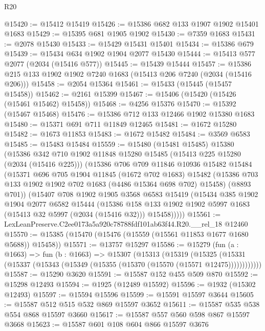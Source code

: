 \begin{lexlean}{R20}
\begin{coremodule}
@15420 := @15412 @15419
@15426 := @15386 @682 @133 @1907 @1902 @15401 @1683
@15429 := @15395 @681 @1905 @1902
@15430 := @7359 @1683
@15431 := @2078 @15430
@15433 := @15429 @15431 @15401
@15434 := @15386 @679
@15439 := @15434 @634 @1902 @1904 @2077 @15430
@15444 := @15413 @577 @2077 (@2034 (@15416 @577))
@15445 := @15439 @15444
@15457 := @15386 @215 @133 @1902 @1902 @7240 @1683 (@15413 @206 @7240 (@2034 (@15416 @206)))
@15458 := @2054 @15364
@15461 := @15433 (@15445 (@15457 @15458))
@15462 := @2161 @15399
@15467 := @15406 (@15420 (@15426 (@15461 @15462) @15458))
@15468 := @4256 @15376
@15470 := @15392 (@15467 @15468)
@15476 := @15386 @712 @133 @12466 @1902 @15380 @1683
@15480 := @15371 @691 @711 @11849 @12465
@15481 := @1672 @15280
@15482 := @1673 @11853
@15483 := @1672 @15482
@15484 := @3569 @6583
@15485 := @15483 @15484
@15559 := @15480
    (@15481 @15485)
    @15380
    (@15386
      @342
      @710
      @1902
      @11848
      @15280
      @15485
      (@15413 @225 @15280 (@2034 (@15416 @225)))
      (@15386
        @706
        @709
        @11846
        @10936
        @15482
        @15484
        (@15371
          @696
          @705
          @1904
          @11845
          (@1672 @702 @1683)
          @15482
          (@15386 @703 @133 @1902 @1902 @702 @1683 (@4486 @15364 @698 @702) @15458)
          (@8893 @701))
        (@15407
          @708
          @1902
          @1905
          @3568
          @6583
          @15419
          (@15434
            @385
            @1902
            @1904
            @2077
            @6582
            @15444
            (@15386
              @158
              @133
              @1902
              @1902
              @5997
              @1683
              (@15413 @32 @5997 (@2034 (@15416 @32)))
              @15458)))))
@15561 := LexLeanPreserve.C2ee0173a5a920c78788fdf101ab63f44.R20.__rel_18 @12460
@15570 := @15385 (@15470 (@15476 (@15559 (@15561 @11853 @1677 @1680 @5688)) @15458))
@15571 := @13757 @15297
@15586 := @15279
    (fun (a : @1663) =>
    fun (b : @1663) =>
    @15307
      (@15313
        (@15319
          (@15325 (@15331 (@15337 (@15343 (@15349 (@15355 (@15370 (@15570 (@15571 @12475))))))))))))
@15587 := @15290 @3620
@15591 := @15587 @152 @455 @509 @870
@15592 := @15298 @12493
@15594 := @1925 (@12489 @15592)
@15596 := @1932 (@15302 @12493)
@15597 := @15594 @15596
@15599 := @15591 @15597 @3644
@15605 := @15587 @512 @515 @532 @869 @15597 @3652
@15611 := @15587 @535 @538 @554 @868 @15597 @3660
@15617 := @15587 @557 @560 @598 @867 @15597 @3668
@15623 := @15587 @601 @108 @604 @866 @15597 @3676

\end{coremodule}
\end{lexlean}
